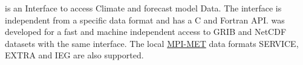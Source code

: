 {\CDI} is an Interface to access Climate and forecast model Data.
The interface is independent from a specific data format and has a C and Fortran API.
{\CDI} was developed for a fast and machine independent access to GRIB
and NetCDF datasets with the same interface.
The local \href{http://www.mpimet.mpg.de/}{MPI-MET} data formats SERVICE, EXTRA and 
IEG are also supported.



